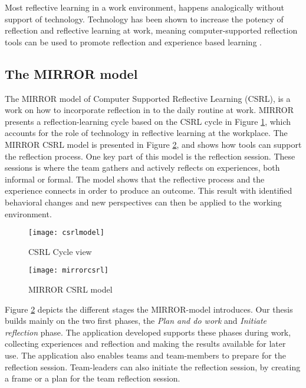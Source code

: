 Most reflective learning in a work environment, happens analogically without support of technology\citep{Schindler_Eppler_2003}. Technology has been shown to increase the potency of reflection and reflective learning at work, meaning computer-supported reflection tools can be used to promote reflection and experience based learning \citep{krogstiereflectionwork, Lin_Hmelo_Kinzer_Secules_1999,Xiao_Clark_Rosson_Carroll_2008}. 

\subsection{The MIRROR model}
\label{mirrorsection}
The MIRROR model of Computer Supported Reflective Learning (CSRL), is a work on how to incorporate reflection in to the daily routine at work. 
MIRROR presents a reflection-learning cycle based on the CSRL cycle in Figure \ref{csrlmodel}, which accounts for the role of technology in reflective learning at the workplace. The MIRROR CSRL model is presented in Figure \ref{mirrormodel}, and shows how tools can support the reflection process. One key part of this model is the reflection session. These sessions is where the team gathers and actively reflects on experiences, both informal or formal. The model shows that the reflective process and the experience connects in order to produce an outcome. This result with identified behavioral changes and new perspectives can then be applied to the working environment. 
\begin{figure}[!htpb]
\centering
	\texttt{[image: csrlmodel]}
\caption{CSRL Cycle view \citep{Krogstie2011}}
\label{csrlmodel}
\end{figure}

\begin{figure}[h!]
\centering
	\texttt{[image: mirrorcsrl]}
\caption{MIRROR CSRL model \citep{csrlmirror121}}
\label{mirrormodel}
\end{figure}

Figure \ref{mirrormodel} depicts the different stages the MIRROR-model introduces. Our thesis builds mainly on the two first phases, the \emph{Plan and do work} and \emph{Initiate reflection} phase. The application developed supports these phases during work, collecting experiences and reflection and making the results available for later use. The application also enables teams and team-members to prepare for the reflection session. Team-leaders can also initiate the reflection session, by creating a frame or a plan for the team reflection session. 
\clearpage
